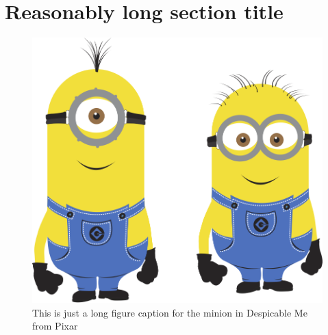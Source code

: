 \section{Reasonably long section title}




\begin{figure}[htbp!]
\centering
\includegraphics[width=1.0\textwidth]{minion}
\caption[Minion]{This is just a long figure caption for the minion in Despicable Me from Pixar}
\label{fig:minion}
\end{figure}
